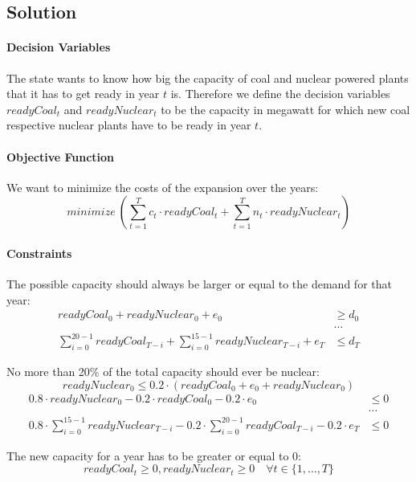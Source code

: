 \documentclass[a4paper, 12pt]{report}
\begin{document}
\subsection{Solution}

\paragraph{Decision Variables} The state wants to know how big the capacity of
coal and nuclear powered plants that it has to get ready in year $t$ is.
Therefore we define the decision variables $readyCoal_t$ and $readyNuclear_t$ to
be the capacity in megawatt for which new coal respective nuclear plants have to
be ready in year $t$.

\paragraph{Objective Function} We want to minimize the costs of the expansion
over the years:
\[
    minimize ~
    \left(
        ∑_{t=1}^{T} c_t · readyCoal_t + ∑_{t=1}^{T} n_t · readyNuclear_t
    \right)
\]

\paragraph{Constraints}

The possible capacity should always be larger or equal to the demand for that
year:
\begin{align*}
    readyCoal_0 + readyNuclear_0 + e_0      &≥ d_0\\
                                            &…\\
    ∑_{i=0}^{20-1} readyCoal_{T-i} +
    ∑_{i=0}^{15-1} readyNuclear_{T-i} + e_T &≤ d_T
\end{align*}

No more than 20\% of the total capacity should ever be nuclear:
\[
    readyNuclear_0 ≤ 0.2 · (readyCoal_0 + e_0 + readyNuclear_0)
\]
\begin{align*}
    0.8 · readyNuclear_0 - 0.2 · readyCoal_0 - 0.2 · e_0 &≤ 0\\
                                                   &…\\
    0.8 · ∑_{i=0}^{15-1} readyNuclear_{T-i} -
    0.2 · ∑_{i=0}^{20-1} readyCoal_{T-i} -
    0.2 · e_T                                      &≤ 0
\end{align*}

The new capacity for a year has to be greater or equal to 0:
\[
    readyCoal_t ≥ 0, readyNuclear_t ≥0 \quad ∀ t ∈ \{1,…,T\}
\]
\end{document}
